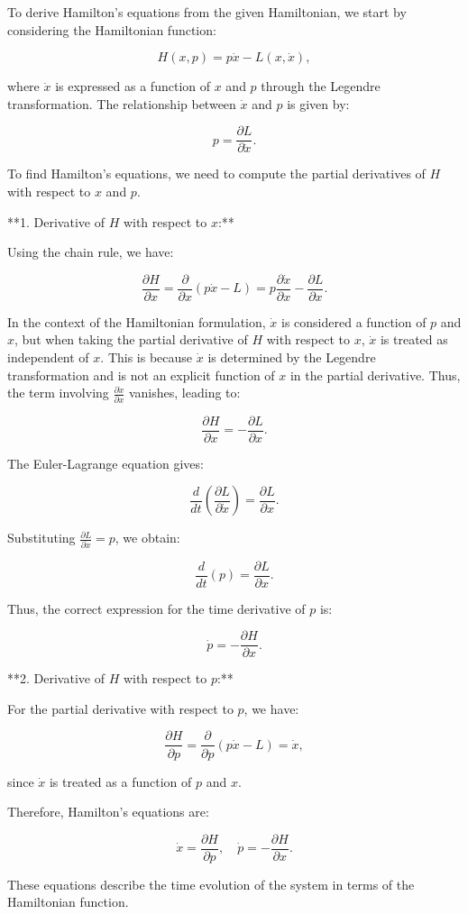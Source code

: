 To derive Hamilton's equations from the given Hamiltonian, we start by considering the Hamiltonian function:

$$
H(x, p) = p \dot{x} - L(x, \dot{x}),
$$

where \( \dot{x} \) is expressed as a function of \( x \) and \( p \) through the Legendre transformation. The relationship between \( \dot{x} \) and \( p \) is given by:

$$
p = \frac{\partial L}{\partial \dot{x}}.
$$

To find Hamilton's equations, we need to compute the partial derivatives of \( H \) with respect to \( x \) and \( p \).

**1. Derivative of \( H \) with respect to \( x \):**

Using the chain rule, we have:

$$
\frac{\partial H}{\partial x} = \frac{\partial}{\partial x} (p \dot{x} - L) = p \frac{\partial \dot{x}}{\partial x} - \frac{\partial L}{\partial x}.
$$

In the context of the Hamiltonian formulation, \( \dot{x} \) is considered a function of \( p \) and \( x \), but when taking the partial derivative of \( H \) with respect to \( x \), \( \dot{x} \) is treated as independent of \( x \). This is because \( \dot{x} \) is determined by the Legendre transformation and is not an explicit function of \( x \) in the partial derivative. Thus, the term involving \( \frac{\partial \dot{x}}{\partial x} \) vanishes, leading to:

$$
\frac{\partial H}{\partial x} = -\frac{\partial L}{\partial x}.
$$

The Euler-Lagrange equation gives:

$$
\frac{d}{dt} \left( \frac{\partial L}{\partial \dot{x}} \right) = \frac{\partial L}{\partial x}.
$$

Substituting \( \frac{\partial L}{\partial \dot{x}} = p \), we obtain:

$$
\frac{d}{dt}(p) = \frac{\partial L}{\partial x}.
$$

Thus, the correct expression for the time derivative of \( p \) is:

$$
\dot{p} = -\frac{\partial H}{\partial x}.
$$

**2. Derivative of \( H \) with respect to \( p \):**

For the partial derivative with respect to \( p \), we have:

$$
\frac{\partial H}{\partial p} = \frac{\partial}{\partial p} (p \dot{x} - L) = \dot{x},
$$

since \( \dot{x} \) is treated as a function of \( p \) and \( x \).

Therefore, Hamilton's equations are:

$$
\dot{x} = \frac{\partial H}{\partial p}, \quad \dot{p} = -\frac{\partial H}{\partial x}.
$$

These equations describe the time evolution of the system in terms of the Hamiltonian function.